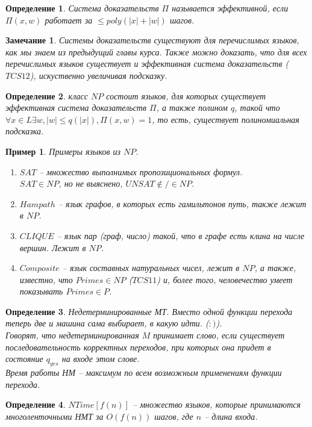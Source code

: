 \documentclass[12pt, letterpaper]{article}
\newtheorem{defi}{Определение}[section]
\newtheorem{sample}{Пример}[section]
\newtheorem{note}{Замечание}[section]
\begin{document}
\begin{defi}
Система доказательств $\Pi$ называется эффективной, если $\Pi(x,w)$ работает за $\leq poly(|x|+|w|)$ шагов.
\end{defi}

\begin{note}
Системы доказательств существуют для перечислимых языков, как мы знаем из предыдущий главы курса. Также можно доказать, что для всех перечислимых языков существует и эффективная система доказательств ($TCS12$), искуственно увеличивая подсказку.
\end{note}

\begin{defi}
класс $NP$ состоит языков, для которых существует эффективная система доказательств $\Pi$, а также полином $q$, такой что $\forall x \in L \exists w, |w| \leq q(|x|), \Pi(x,w)=1$, то есть, существует полиномиальная подсказка.
\end{defi}

\begin{sample}
Примеры языков из $NP$.
\begin{enumerate}
\item $SAT$ -- множество выполнимых пропозициональных формул. \\
$SAT \in NP$, но не выяснено, $UNSAT \notin/\in NP$.
\item $Hampath$ -- язык графов, в которых есть гамильтонов путь, также лежит в $NP$.
\item $CLIQUE$ -- язык пар (граф, число) такой, что в графе есть клина на числе вершин. Лежит в $NP$.
\item $Composite$ -- язык составных натуральных чисел, лежит в $NP$, а также, известно, что $Primes \in NP$ ($TCS11$) и, более того, человечество умеет показывать $Primes \in P$.  
\end{enumerate}
\end{sample}

\begin{defi}
Недетерминированные МТ. Вместо одной функции перехода теперь две и машина сама выбирает, в какую идти. ($:)$).\\
Говорят, что недетерминированная $M$ принимает слово, если существует последовательность корректных переходов, при которых она придет в состояние $q_{yes}$ на входе этом слове. \\
Время работы НМ -- максимум по всем возможным применениям функции перехода.
\end{defi}

\begin{defi}
$NTime[f(n)]$ -- множество языков, которые принимаются многоленточными НМТ за $O(f(n))$ шагов, где $n$ -- длина входа.
\end{defi}
\end{document}
